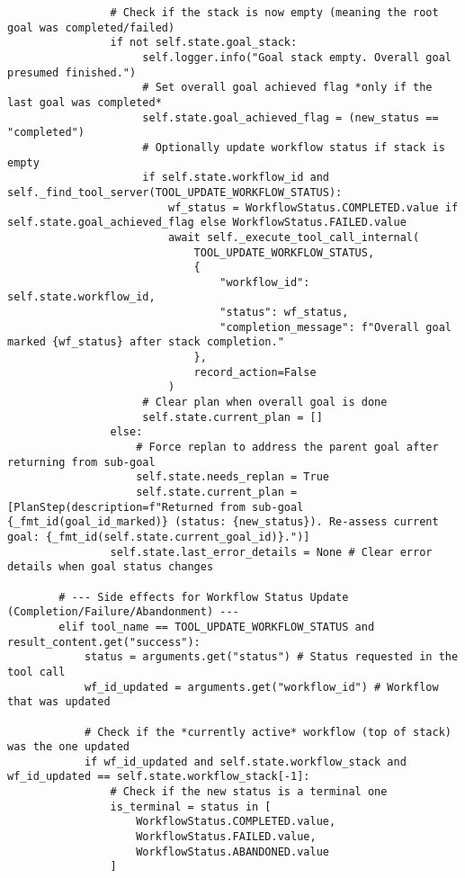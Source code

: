 \documentclass[12pt,a4paper]{article}
\begin{document}
\begin{pageablecode}
\begin{verbatim}
                # Check if the stack is now empty (meaning the root goal was completed/failed)
                if not self.state.goal_stack:
                     self.logger.info("Goal stack empty. Overall goal presumed finished.")
                     # Set overall goal achieved flag *only if the last goal was completed*
                     self.state.goal_achieved_flag = (new_status == "completed")
                     # Optionally update workflow status if stack is empty
                     if self.state.workflow_id and self._find_tool_server(TOOL_UPDATE_WORKFLOW_STATUS):
                         wf_status = WorkflowStatus.COMPLETED.value if self.state.goal_achieved_flag else WorkflowStatus.FAILED.value
                         await self._execute_tool_call_internal(
                             TOOL_UPDATE_WORKFLOW_STATUS,
                             {
                                 "workflow_id": self.state.workflow_id,
                                 "status": wf_status,
                                 "completion_message": f"Overall goal marked {wf_status} after stack completion."
                             },
                             record_action=False
                         )
                     # Clear plan when overall goal is done
                     self.state.current_plan = []
                else:
                    # Force replan to address the parent goal after returning from sub-goal
                    self.state.needs_replan = True
                    self.state.current_plan = [PlanStep(description=f"Returned from sub-goal {_fmt_id(goal_id_marked)} (status: {new_status}). Re-assess current goal: {_fmt_id(self.state.current_goal_id)}.")]
                self.state.last_error_details = None # Clear error details when goal status changes

        # --- Side effects for Workflow Status Update (Completion/Failure/Abandonment) ---
        elif tool_name == TOOL_UPDATE_WORKFLOW_STATUS and result_content.get("success"):
            status = arguments.get("status") # Status requested in the tool call
            wf_id_updated = arguments.get("workflow_id") # Workflow that was updated

            # Check if the *currently active* workflow (top of stack) was the one updated
            if wf_id_updated and self.state.workflow_stack and wf_id_updated == self.state.workflow_stack[-1]:
                # Check if the new status is a terminal one
                is_terminal = status in [
                    WorkflowStatus.COMPLETED.value,
                    WorkflowStatus.FAILED.value,
                    WorkflowStatus.ABANDONED.value
                ]


\end{verbatim}
\end{pageablecode}
\end{document}
